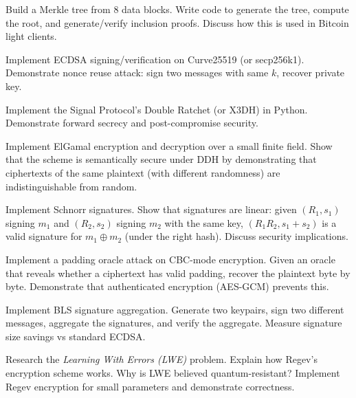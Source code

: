 \begin{exercise}[Basic]
Build a Merkle tree from 8 data blocks. Write code to generate the tree, compute the root, and generate/verify inclusion proofs. Discuss how this is used in Bitcoin light clients.
\end{exercise}

\begin{exercise}[Intermediate]
Implement ECDSA signing/verification on Curve25519 (or secp256k1). Demonstrate nonce reuse attack: sign two messages with same $k$, recover private key.
\end{exercise}

\begin{exercise}[Intermediate]
Implement the Signal Protocol's Double Ratchet (or X3DH) in Python. Demonstrate forward secrecy and post-compromise security.
\end{exercise}

\begin{exercise}[Intermediate]
Implement ElGamal encryption and decryption over a small finite field. Show that the scheme is semantically secure under DDH by demonstrating that ciphertexts of the same plaintext (with different randomness) are indistinguishable from random.
\end{exercise}

\begin{exercise}[Intermediate]
Implement Schnorr signatures. Show that signatures are linear: given $(R_1, s_1)$ signing $m_1$ and $(R_2, s_2)$ signing $m_2$ with the same key, $(R_1 R_2, s_1 + s_2)$ is a valid signature for $m_1 \oplus m_2$ (under the right hash). Discuss security implications.
\end{exercise}

\begin{exercise}[Intermediate]
Implement a padding oracle attack on CBC-mode encryption. Given an oracle that reveals whether a ciphertext has valid padding, recover the plaintext byte by byte. Demonstrate that authenticated encryption (AES-GCM) prevents this.
\end{exercise}

\begin{exercise}[Intermediate]
Implement BLS signature aggregation. Generate two keypairs, sign two different messages, aggregate the signatures, and verify the aggregate. Measure signature size savings vs standard ECDSA.
\end{exercise}

\begin{exercise}[Challenge]
Research the \emph{Learning With Errors (LWE)} problem. Explain how Regev's encryption scheme works. Why is LWE believed quantum-resistant? Implement Regev encryption for small parameters and demonstrate correctness.
\end{exercise}

